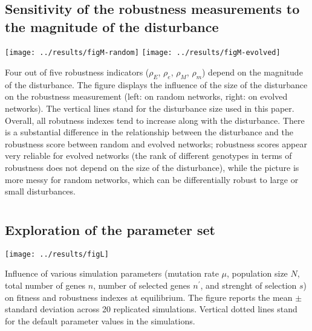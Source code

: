 \documentclass[a4paper]{article}
\newcommand{\earlyenv}{{\rho_E}}
\newcommand{\lateenv}{{\rho_e}}
\newcommand{\earlymut}{{\rho_M}}
\newcommand{\latemut}{{\rho_m}}
\begin{document}
\begin{appendices}
  \clearpage
  \section{}
    \label{supp:sensitmag}
    \subsection*{Sensitivity of the robustness measurements to the magnitude of the disturbance}

	\texttt{[image: ../results/figM-random]} \texttt{[image: ../results/figM-evolved]}
	
	Four out of five robustness indicators ($\earlyenv$, $\lateenv$, $\earlymut$, $\latemut$) depend on the magnitude of the disturbance. The figure displays the influence of the size of the disturbance on the robustness measurement (left: on random networks, right: on evolved networks). The vertical lines stand for the disturbance size used in this paper. Overall, all robutness indexes tend to increase along with the disturbance. There is a substantial difference in the relationship between the disturbance and the robustness score between random and evolved networks; robustness scores appear very reliable for evolved networks (the rank of different genotypes in terms of robustness does not depend on the size of the disturbance), while the picture is more messy for random networks, which can be differentially robust to large or small disturbances. 


  \clearpage
  \section{}
    \label{supp:explo}
    \subsection*{Exploration of the parameter set}
	\begin{center}
	\texttt{[image: ../results/figL]} 
	\end{center}
	
	Influence of various simulation parameters (mutation rate $\mu$, population size $N$, total number of genes $n$, number of selected genes $n^\prime$, and strenght of selection $s$) on fitness and robustness indexes at equilibrium. The figure reports the mean $\pm$ standard deviation across 20 replicated simulations. Vertical dotted lines stand for the default parameter values in the simulations. 




\end{appendices}
\end{document}
